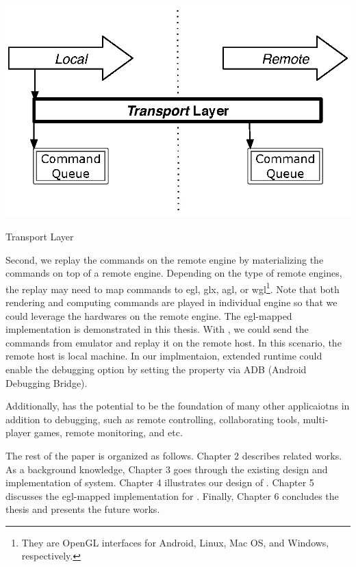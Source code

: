 \begin{center-figure}
    \includegraphics[scale=0.8]{fig/TransportLayer.eps}
    \caption{Transport Layer}
    \label{fig:transport-layer}
\end{center-figure}

Second, we replay the commands on the remote engine by materializing the commands on top of a remote engine. Depending on the type of remote engines, the replay may need to map \RS{} commands to egl, glx, agl, or wgl\footnote{They are OpenGL interfaces for Android, Linux, Mac OS, and Windows, respectively.}. Note that both rendering and computing commands are played in individual engine so that we could leverage the hardwares on the remote engine. The egl-mapped implementation is demonstrated in this thesis.
With \RRS{}, we could send the commands from emulator and replay it on the remote host. In this scenario, the remote host is local machine. In our implmentaion, extended \RS{} runtime could enable the debugging option by setting the property via ADB (Android Debugging Bridge).

Additionally, \RRS{} has the potential to be the foundation of many other applicaiotns in addition to debugging, such as remote controlling, collaborating tools, multi-player games, remote monitoring, and etc. 

The rest of the paper is organized as follows. Chapter 2 describes related works. As a background knowledge, Chapter 3 goes through the existing design and implementation of \RS{} system. Chapter 4 illustrates our design of \RRS{}. Chapter 5 discusses the egl-mapped implementation for \RRS{}. Finally, Chapter 6 concludes the thesis and presents the future works.
